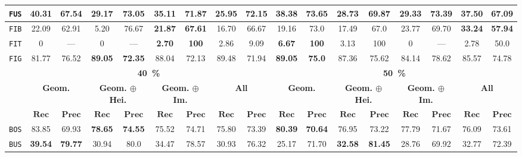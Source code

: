 \begin{sidewaystable}[htbp]
\begin{center}
\begin{tabular}{|c | c c | c c | c c | c c || c c | c c | c c | c c |}
                    \hline
                    \texttt{FUS} & \textbf{40.31} & \textbf{67.54} & 29.17 & 73.05 & 35.11 & 71.87 & 25.95 & 72.15 & \textbf{38.38} & \textbf{73.65} & 28.73 & 69.87 & 29.33 & 73.39 & 37.50 & 67.09 \\
                    \hline
                    \texttt{FIB} & 22.09 & 62.91 & 5.20 & 76.67 & \textbf{21.87} & \textbf{67.61} & 16.70 & 66.67 & 19.16 & 73.0 & 17.49 & 67.0 & 23.77 & 69.70 & \textbf{33.24} & \textbf{57.94} \\
                    \hline
                    \texttt{FIT} & 0 & --- & 0 & --- & \textbf{2.70} & \textbf{100} & 2.86 & 9.09 & \textbf{6.67} & \textbf{100} & 3.13 & 100 & 0 & --- & 2.78 & 50.0 \\
                    \hline
                    \texttt{FIG} & 81.77 & 76.52 & \textbf{89.05} & \textbf{72.35} & 88.04 & 72.13 & 89.48 & 71.94 & \textbf{89.05} & \textbf{75.0} & 87.36 & 75.62 & 84.14 & 78.62 & 85.57 & 74.78 \\
                    \hline
                    \hline
                    & \multicolumn{8}{c||}{\textbf{\SI{40}{\percent}}} & \multicolumn{8}{c|}{\textbf{\SI{50}{\percent}}}\\
                    \hline
                    &\multicolumn{2}{c|}{\textbf{Geom.}} & \multicolumn{2}{c|}{\textbf{Geom. \(\oplus\) Hei.}} & \multicolumn{2}{c|}{\textbf{Geom. \(\oplus\) Im.}} & \multicolumn{2}{c||}{\textbf{All}} & \multicolumn{2}{c|}{\textbf{Geom.}} & \multicolumn{2}{c|}{\textbf{Geom. \(\oplus\) Hei.}} & \multicolumn{2}{c|}{\textbf{Geom. \(\oplus\) Im.}} & \multicolumn{2}{x{1.5cm}|}{\textbf{All}}\\
                    \cline{2-17}
                    & \(\bm{Rec}\) & \(\bm{Prec}\) &  \(\bm{Rec}\) & \(\bm{Prec}\) &  \(\bm{Rec}\) & \(\bm{Prec}\) &  \(\bm{Rec}\) & \(\bm{Prec}\) & \(\bm{Rec}\) & \(\bm{Prec}\) &  \(\bm{Rec}\) & \(\bm{Prec}\) &  \(\bm{Rec}\) & \(\bm{Prec}\) &  \(\bm{Rec}\) & \(\bm{Prec}\) \\
                    \hline
                    \texttt{BOS} & 83.85 & 69.93 & \textbf{78.65} & \textbf{74.55} & 75.52 & 74.71 & 75.80 & 73.39 & \textbf{80.39} & \textbf{70.64} & 76.95 & 73.22 & 77.79 & 71.67 & 76.09 & 73.61 \\
                    \hline
                    \texttt{BUS} & \textbf{39.54} & \textbf{79.77} & 30.94 & 80.0 & 34.47 & 78.57 & 30.93 & 76.32 & 25.17 & 71.70 & \textbf{32.58} & \textbf{81.45} & 28.76 & 69.92 & 32.77 & 72.39 \\
                    \hline

\end{tabular}
\end{center}
\end{sidewaystable}
